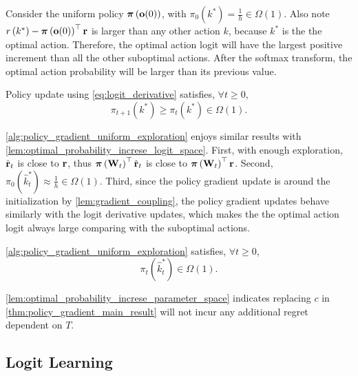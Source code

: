 Consider the uniform policy ${\boldsymbol{\pi}}\left( {\mathbf{o}}(0) \right)$, with $\pi_{0}\left(k^*\right) = \frac{1}{h} \in \Omega(1)$. Also note $r\left(k^*\right) - {\boldsymbol{\pi}}\left( {\mathbf{o}}(0) \right)^\top {\mathbf{r}}$ is larger than any other action $k$, because $k^*$ is the the optimal action. Therefore, the optimal action logit will have the largest positive increment than all the other suboptimal actions. After the softmax transform, the optimal action probability will be larger than its previous value. 
\begin{lem}
\label{lem:optimal_probability_increse_logit_space}
Policy update using \cref{eq:logit_derivative} satisfies, $\forall t \ge 0$,
\begin{equation*}
    \pi_{t+1}\left(k^*\right) \ge \pi_{t}\left(k^*\right) \in \Omega(1).
\end{equation*}
\end{lem}

\cref{alg:policy_gradient_uniform_exploration} enjoys similar results with \cref{lem:optimal_probability_increse_logit_space}. First, with enough exploration, $\hat{{\mathbf{r}}}_t$ is close to ${\mathbf{r}}$, thus ${\boldsymbol{\pi}}\left({\mathbf{W}}_t\right)^\top \hat{{\mathbf{r}}}_t$ is close to ${\boldsymbol{\pi}}\left({\mathbf{W}}_t\right)^\top {\mathbf{r}}$. Second, $\pi_0\left(\hat{k}_t^*\right) \approx \frac{1}{h} \in \Omega(1)$. Third, since the policy gradient update is around the initialization by \cref{lem:gradient_coupling}, the policy gradient updates behave similarly with the logit derivative updates, which makes the the optimal action logit always large comparing with the suboptimal actions.
\begin{lem}
\label{lem:optimal_probability_increse_parameter_space}
\cref{alg:policy_gradient_uniform_exploration} satisfies, $\forall t \ge 0$,
\begin{equation*}
    \pi_t\left(\hat{k}_t^*\right) \in \Omega(1).
\end{equation*}
\end{lem}
\cref{lem:optimal_probability_increse_parameter_space} indicates replacing $c$ in \cref{thm:policy_gradient_main_result} will not incur any additional regret dependent on $T$.

\subsection{Logit Learning}
\label{subsec:theoretical_analyses_logit_learning}

